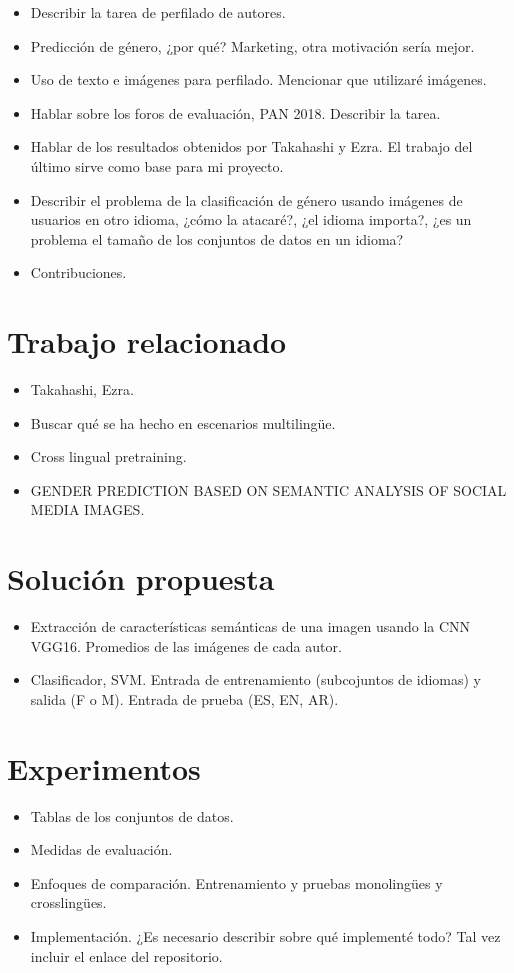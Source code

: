 \documentclass[runningheads]{llncs}
\begin{document}
\begin{itemize}
    \item Describir la tarea de perfilado de autores.
    \item Predicción de género, ¿por qué? Marketing, otra motivación
    sería mejor.
    \item Uso de texto e imágenes para perfilado. Mencionar que 
    utilizaré imágenes.
    \item Hablar sobre los foros de evaluación, PAN 2018. Describir la
    tarea.
    \item Hablar de los resultados obtenidos por Takahashi y Ezra. El
    trabajo del último sirve como base para mi proyecto.
    \item Describir el problema de la clasificación de género 
    usando imágenes de usuarios en otro idioma, ¿cómo la atacaré?,
    ¿el idioma importa?, ¿es un problema el tamaño de los conjuntos de 
    datos en un idioma?
    \item Contribuciones.
\end{itemize}
\section{Trabajo relacionado}
\begin{itemize}
    \item Takahashi, Ezra.
    \item Buscar qué se ha hecho en escenarios multilingüe.
    \item Cross lingual pretraining.
    \item GENDER PREDICTION BASED ON SEMANTIC ANALYSIS OF SOCIAL MEDIA 
    IMAGES.
\end{itemize}
\section{Solución propuesta}
\begin{itemize}
    \item Extracción de características semánticas de una imagen usando
    la CNN VGG16. Promedios de las imágenes de cada autor.
    \item Clasificador, SVM. Entrada de entrenamiento (subcojuntos de idiomas) y salida (F o M). Entrada de prueba (ES, EN, AR).
\end{itemize}
\section{Experimentos}
\begin{itemize}
    \item Tablas de los conjuntos de datos.
    \item Medidas de evaluación.
    \item Enfoques de comparación. Entrenamiento y pruebas monolingües y
    crosslingües.
    \item Implementación. ¿Es necesario describir sobre qué implementé 
    todo? Tal vez incluir el enlace del repositorio.
\end{itemize}
\end{document}
